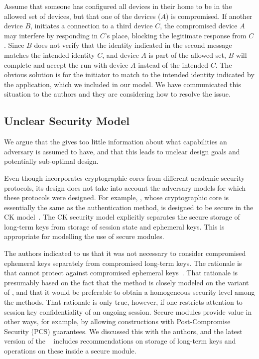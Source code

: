 \documentclass[a4paper,twoside]{article}
\begin{document}
Assume that someone has configured all devices in their home to be in the
allowed set of devices, but that one of the devices ($A$) is compromised.
%
If another device $B$, initiates a connection to a third device $C$, the
compromised device $A$ may interfere by responding in $C$'s place, blocking
the legitimate response from $C$.
%
Since $B$ does not verify that the identity indicated in the second message
matches the intended identity $C$, and device $A$ is part of the allowed set,
$B$ will complete and accept the \mEdhoc{} run with device $A$ instead of the
intended $C$.
%
The obvious solution is for the initiator to match \mIdcredr{} to the intended
identity indicated by the application, which we included in our model.
%
We have communicated this situation to the \mEdhoc{} authors and they are considering
how to resolve the issue.
%

\subsection{Unclear Security Model}
We argue that the \mSpec{} gives too little information about what capabilities
an adversary is assumed to have, and that this leads to unclear design goals and
potentially sub-optimal design.
%

Even though \mEdhoc{} incorporates cryptographic cores from different academic
security protocols, its design does not take into account the adversary models
for which these protocols were designed.
%
For example, \mOptls{}, whose cryptographic core is essentially the same
as the \mStat{} authentication method, is designed to be secure in the CK
model~\cite{DBLP:conf/crypto/CanettiK02}.
%
The CK security model explicitly separates the secure storage of long-term
keys from storage of session state and ephemeral keys.
%
This is appropriate for modelling the use of secure modules.
%

The \mEdhoc{} authors indicated to us that it was
not necessary to consider compromised ephemeral keys separately from
compromised long-term keys.
%
The rationale is that \mSigma{} cannot protect against compromised ephemeral
keys~\cite{personalCommunication}.
%
That rationale is presumably based on the fact that the \mSigSig{} method is
closely modeled on the \mSigmaI{} variant of \mSigma{}, and that it would be
preferable to obtain a homogeneous security level among the \mEdhoc{}
methods.
%
That rationale is only true, however, if one restricts attention to session key
confidentiality of an ongoing session.
%
Secure modules provide value in other ways, for example, by allowing
constructions with Post-Compromise Security (PCS) guarantees.
%
We discussed this with the authors, and
the latest version of the \mSpec{}~\cite{latest-ietf-lake-edhoc-05} includes
recommendations on storage of long-term keys and operations on these inside a
secure module.
%
\end{document}
